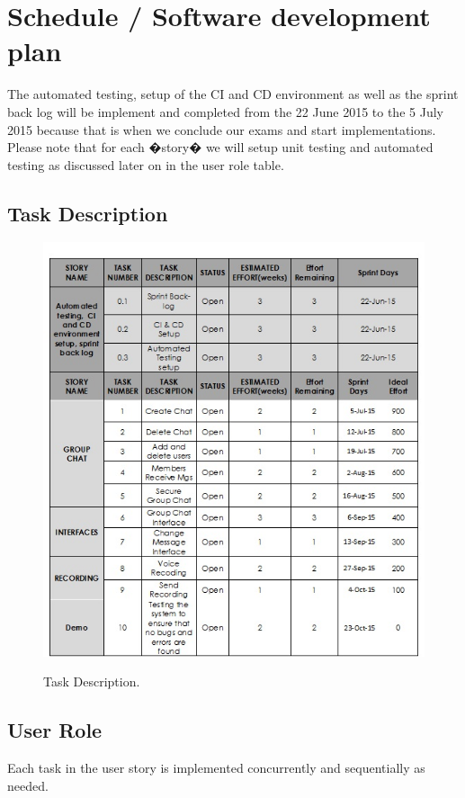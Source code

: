 \documentclass[a4paper]{article}
\begin{document}
\section{Schedule / Software development plan}
The automated testing, setup of the CI and CD environment as well as the sprint back log will be implement and completed from the 22 June 2015 to the 5 July 2015 because that is when we conclude our exams and start implementations.
Please note that for each �story� we will setup unit testing and automated testing as discussed later on in the user role table.

\subsection{Task Description}

\begin{figure}
\includegraphics[width=1\linewidth]{./pictures/task.jpg}\\
\caption{\label{fig:Discription}Task Description.}
\end{figure}

\subsection{User Role}
Each task in the user story is implemented concurrently and sequentially as needed.
\end{document}
